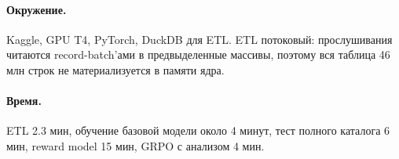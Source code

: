 \paragraph{Окружение.} Kaggle, GPU T4, PyTorch, DuckDB для ETL. ETL
потоковый: прослушивания читаются record-batch'ами в предвыделенные массивы,
поэтому вся таблица 46 млн строк не материализуется в памяти ядра.

\paragraph{Время.} ETL 2.3 мин, обучение базовой модели около 4 минут, тест
полного каталога 6 мин, reward model 15 мин, GRPO с анализом 4 мин.
